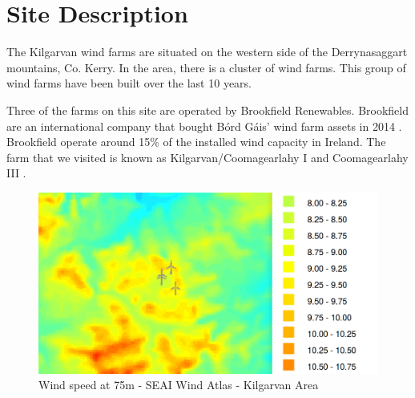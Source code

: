 \documentclass[12pt]{article} %
\begin{document}




\section{Site Description} %

The Kilgarvan wind farms are situated on the western side of the Derrynasaggart mountains, Co. Kerry. In the area, there is a cluster of wind farms. This group of wind farms have been built over the last 10 years.

Three of the farms on this site are operated by Brookfield Renewables. Brookfield are an international company that bought Bórd Gáis' wind farm assets in 2014 \cite{silicon_republic}. Brookfield operate around 15\% of the installed wind capacity in Ireland.
The farm that we visited is known as Kilgarvan/Coomagearlahy I and Coomagearlahy III \cite{iwea}.

\begin{figure}[h]
  \begin{center}
    \includegraphics[width=1\textwidth]{seai_wind_atlas_kilgarvan}
  \end{center}
  \caption{Wind speed at 75m - SEAI Wind Atlas - Kilgarvan Area}
\end{figure}
\end{document}
